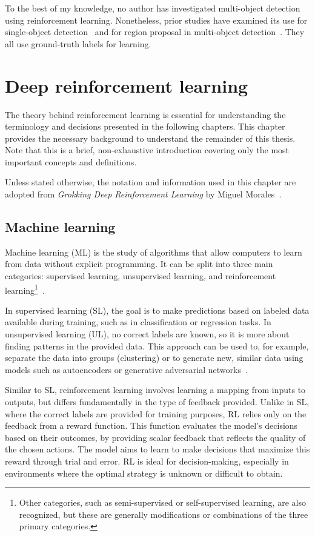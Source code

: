 \documentclass[
  digital,     %
  oneside,     %
  nosansbold,  %
  nocolorbold, %
  lof,         %
  lot,         %
]{fithesis4}
\begin{document}
To the best of my knowledge, no author has investigated multi-object detection using reinforcement learning. Nonetheless, prior studies have examined its use for single-object detection~\cite{iterative_od_with_rl, hierarchical_od_with_drl} and for region proposal in multi-object detection~\cite{drl_rpn}. They all use ground-truth labels for learning.

\chapter{Deep reinforcement learning}
\label{ch:dlr}

The theory behind reinforcement learning is essential for understanding the terminology and decisions presented in the following chapters. This chapter provides the necessary background to understand the remainder of this thesis. Note that this is a brief, non-exhaustive introduction covering only the most important concepts and definitions.

Unless stated otherwise, the notation and information used in this chapter are adopted from \textit{Grokking Deep Reinforcement Learning} by Miguel Morales~\cite{GDRL}.

\section{Machine learning}
Machine learning (ML) is the study of algorithms that allow computers to learn from data without explicit programming. It can be split into three main categories: supervised learning, unsupervised learning, and reinforcement learning\footnote{Other categories, such as semi-supervised or self-supervised learning, are also recognized, but these are generally modifications or combinations of the three primary categories.}~\cite{IB031}.

In supervised learning (SL), the goal is to make predictions based on labeled data available during training, such as in classification or regression tasks. In unsupervised learning (UL), no correct labels are known, so it is more about finding patterns in the provided data. This approach can be used to, for example, separate the data into groups (clustering) or to generate new, similar data using models such as autoencoders or generative adversarial networks~\cite{IB031, PV021}.

Similar to SL, reinforcement learning involves learning a mapping from inputs to outputs, but differs fundamentally in the type of feedback provided. Unlike in SL, where the correct labels are provided for training purposes, RL relies only on the feedback from a reward function. This function evaluates the model's decisions based on their outcomes, by providing scalar feedback that reflects the quality of the chosen actions. The model aims to learn to make decisions that maximize this reward through trial and error. RL is ideal for decision-making, especially in environments where the optimal strategy is unknown or difficult to obtain.
\end{document}
